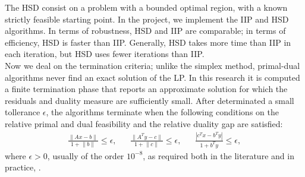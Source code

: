 \documentclass[a4paper,10 pt,titlepage,twoside]{book}
\theoremstyle{plain}
\theoremstyle{definition}
\theoremstyle{remark}
\begin{document}
The HSD consist on a problem with a bounded optimal
region, with a known strictly feasible starting point.
In the project, we implement the IIP and HSD algorithms. In terms of robustness, HSD and IIP are comparable; in terms of
efficiency, HSD is faster than IIP. Generally, HSD takes more time than IIP in
each iteration, but HSD uses fewer iterations than IIP.
\\
Now we deal on the termination criteria; unlike the simplex method, primal-dual algorithms never find an exact solution of the LP. In this research it is computed a finite termination phase that reports an approximate solution for which the residuals and duality measure are sufficiently small. After determinated a small tollerance $\epsilon$, the algorithms terminate when the following conditions on the relative primal and dual feasibility and the relative duality gap are satisfied:
\begin{align*}
\frac{\lVert Ax -b\rVert}{1+ \lVert b \rVert}\leq \epsilon, && \frac{\lVert A^{T}y -c\rVert}{1 + \lVert c \rVert}\leq \epsilon, &&\frac{|c^{T}x - b^{T}y|}{1+b^{T}y}\leq \epsilon,
\end{align*}
where $\epsilon > 0$, usually of the order $10^{-8}$, as required both in the literature and in practice, \cite{Wright}.
\end{document}
